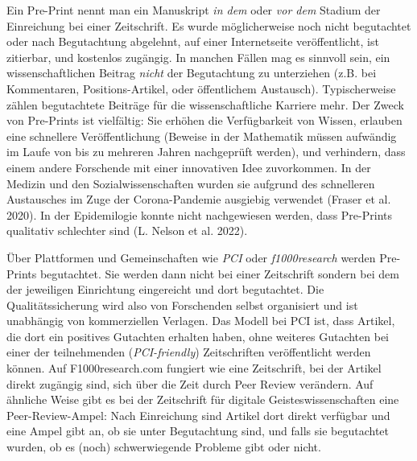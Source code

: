 \documentclass[
  letterpaper,
  DIV=11,
  numbers=noendperiod]{scrreprt}
\begin{document}
\begin{tcolorbox}[enhanced jigsaw, title=\textcolor{quarto-callout-tip-color}{\faLightbulb}\hspace{0.5em}{Was ist ein Pre-Print?}, colbacktitle=quarto-callout-tip-color!10!white, rightrule=.15mm, titlerule=0mm, left=2mm, bottomrule=.15mm, arc=.35mm, leftrule=.75mm, toprule=.15mm, opacityback=0, breakable, bottomtitle=1mm, colframe=quarto-callout-tip-color-frame, toptitle=1mm, opacitybacktitle=0.6, coltitle=black, colback=white]

Ein Pre-Print nennt man ein Manuskript \emph{in dem} oder \emph{vor dem}
Stadium der Einreichung bei einer Zeitschrift. Es wurde möglicherweise
noch nicht begutachtet oder nach Begutachtung abgelehnt, auf einer
Internetseite veröffentlicht, ist zitierbar, und kostenlos zugängig. In
manchen Fällen mag es sinnvoll sein, ein wissenschaftlichen Beitrag
\emph{nicht} der Begutachtung zu unterziehen (z.B. bei Kommentaren,
Positions-Artikel, oder öffentlichem Austausch). Typischerweise zählen
begutachtete Beiträge für die wissenschaftliche Karriere mehr. Der Zweck
von Pre-Prints ist vielfältig: Sie erhöhen die Verfügbarkeit von Wissen,
erlauben eine schnellere Veröffentlichung (Beweise in der Mathematik
müssen aufwändig im Laufe von bis zu mehreren Jahren nachgeprüft
werden), und verhindern, dass einem andere Forschende mit einer
innovativen Idee zuvorkommen. In der Medizin und den
Sozialwissenschaften wurden sie aufgrund des schnelleren Austausches im
Zuge der Corona-Pandemie ausgiebig verwendet (Fraser et al. 2020). In
der Epidemilogie konnte nicht nachgewiesen werden, dass Pre-Prints
qualitativ schlechter sind (L. Nelson et al. 2022).

\end{tcolorbox}

Über Plattformen und Gemeinschaften wie \emph{PCI} oder
\emph{f1000research} werden Pre-Prints begutachtet. Sie werden dann
nicht bei einer Zeitschrift sondern bei dem der jeweiligen Einrichtung
eingereicht und dort begutachtet. Die Qualitätssicherung wird also von
Forschenden selbst organisiert und ist unabhängig von kommerziellen
Verlagen. Das Modell bei PCI ist, dass Artikel, die dort ein positives
Gutachten erhalten haben, ohne weiteres Gutachten bei einer der
teilnehmenden (\emph{PCI-friendly}) Zeitschriften veröffentlicht werden
können. Auf F1000research.com fungiert wie eine Zeitschrift, bei der
Artikel direkt zugängig sind, sich über die Zeit durch Peer Review
verändern. Auf ähnliche Weise gibt es bei der Zeitschrift für digitale
Geisteswissenschaften eine Peer-Review-Ampel: Nach Einreichung sind
Artikel dort direkt verfügbar und eine Ampel gibt an, ob sie unter
Begutachtung sind, und falls sie begutachtet wurden, ob es (noch)
schwerwiegende Probleme gibt oder nicht.
\end{document}
